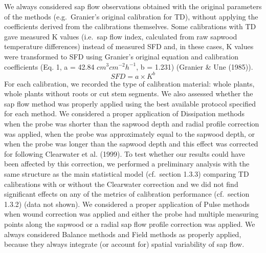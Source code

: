 \documentclass[11pt,twoside]{reedthesis}
\begin{document}
We always considered sap flow observations obtained with the original
parameters of the methods (e.g.~Granier's original calibration for TD),
without applying the coefficients derived from the calibrations
themselves. Some calibrations with TD gave measured K values (i.e.~sap
flow index, calculated from raw sapwood temperature differences) instead
of measured SFD and, in these cases, K values were transformed to SFD
using Granier's original equation and calibration coefficients (Eq. 1, a
= 42.84 \(cm^3 cm^{-2} h^{-1}\), b = 1.231) (Granier \& Une (1985)).
\begin{equation}
SFD = a\times K^b
\end{equation}
For each calibration, we recorded the type of calibration material:
whole plants, whole plants without roots or cut stem segments. We also
assessed whether the sap flow method was properly applied using the best
available protocol specified for each method. We considered a proper
application of Dissipation methods when the probe was shorter than the
sapwood depth and radial profile correction was applied, when the probe
was approximately equal to the sapwood depth, or when the probe was
longer than the sapwood depth and this effect was corrected for
following Clearwater et al. (1999). To test whether our results could
have been affected by this correction, we performed a preliminary
analysis with the same structure as the main statistical model
(cf.~section 1.3.3) comparing TD calibrations with or without the
Clearwater correction and we did not find significant effects on any of
the metrics of calibration performance (cf.~section 1.3.2) (data not
shown). We considered a proper application of Pulse methods when wound
correction was applied and either the probe had multiple measuring
points along the sapwood or a radial sap flow profile correction was
applied. We always considered Balance methods and Field methods as
properly applied, because they always integrate (or account for) spatial
variability of sap flow.\par
\end{document}
